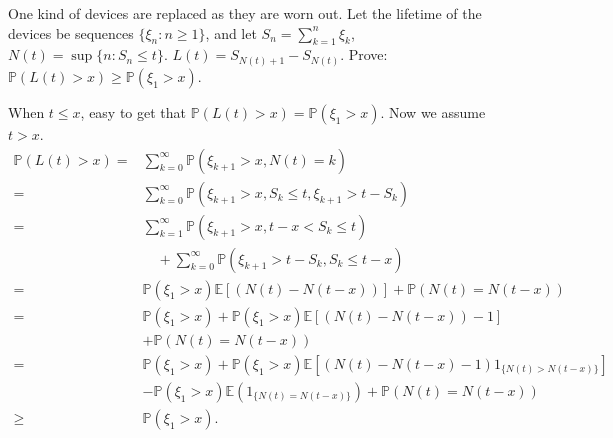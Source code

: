\documentclass{ctexart}
\begin{document}
\begin{problem}\label{pro:4}
  One kind of devices are replaced as they are worn out.
  Let the lifetime of the devices be sequences
  \(\{\xi_n:n \geq 1\}\), and let \(S_n=\sum_{k=1}^{n} \xi_k\), \(N(t)=\sup \{n: S_n \leq t\}\). \(L(t)=S_{N(t) + 1}-S_{N(t)}\).
  Prove: \(\mathbb{P}(L(t)> x) \geq \mathbb{P}(\xi_1 > x)\).
\end{problem}
\begin{solution}
  When \(t \leq x\), easy to get that \(\mathbb{P}(L(t)>x)=\mathbb{P}(\xi_1>x)\).
  Now we assume \(t > x\).
  \begin{equation}
    \begin{aligned}
      \mathbb{P}(L(t)>x)= & \sum_{k=0}^{\infty} \mathbb{P}\left(\xi_{k+1}>x, N(t)=k\right)                                                           \\
      =                   & \sum_{k=0}^{\infty} \mathbb{P}\left(\xi_{k+1}>x, S_k \leq t, \xi_{k+1}>t-S_k\right)                                      \\
      =                   & \sum_{k=1}^{\infty} \mathbb{P}\left(\xi_{k+1}>x, t-x<S_k \leq t\right)                                                   \\
                          & \quad+\sum_{k=0}^{\infty} \mathbb{P}\left(\xi_{k+1}>t-S_k, S_k \leq t-x\right)                                           \\
      =                   & \mathbb{P}\left(\xi_1>x\right) \mathbb{E}[(N(t)-N(t-x))]+\mathbb{P}(N(t)=N(t-x))                                         \\
      =                   & \mathbb{P}\left(\xi_1>x\right)+\mathbb{P}\left(\xi_1>x\right) \mathbb{E}[(N(t)-N(t-x))-1]                                \\
                          & +\mathbb{P}(N(t)=N(t-x))                                                                                                 \\
      =                   & \mathbb{P}\left(\xi_1>x\right)+\mathbb{P}\left(\xi_1>x\right) \mathbb{E}\left[(N(t)-N(t-x)-1) 1_{\{N(t)>N(t-x)\}}\right] \\
                          & -\mathbb{P}\left(\xi_1>x\right) \mathbb{E}\left(1_{\{N(t)=N(t-x)\}}\right)+\mathbb{P}(N(t)=N(t-x))                       \\
      \geq                & \mathbb{P}\left(\xi_1>x\right) .
    \end{aligned}
  \end{equation}
\end{solution}
\end{document}
